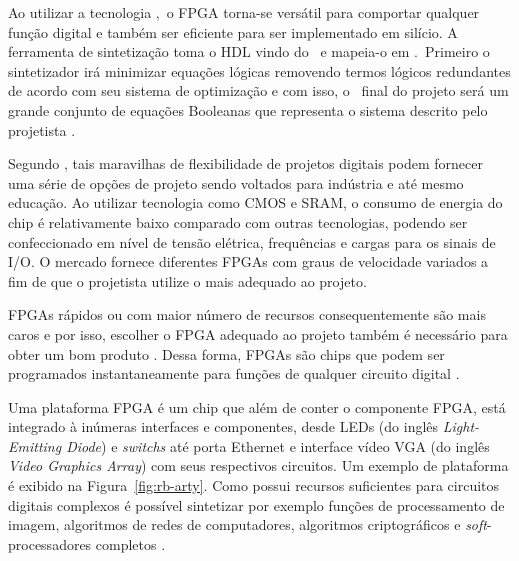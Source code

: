         Ao utilizar a tecnologia \lut,\ o FPGA torna-se versátil para comportar qualquer função digital e também ser eficiente para ser implementado em silício.
        A ferramenta de sintetização toma o HDL vindo do \designer\ e mapeia-o em \hardware.\ 
        Primeiro o sintetizador irá minimizar equações lógicas removendo termos lógicos redundantes de acordo com seu sistema de optimização e com isso, o \design\ final do projeto será um grande conjunto de equações Booleanas que representa o sistema descrito pelo projetista \citep{coffman1999real}.
       
        
        Segundo \citet{tocci2003sistemas}, tais maravilhas de flexibilidade de projetos digitais podem fornecer uma série de opções de projeto sendo voltados para indústria e até mesmo educação.
        Ao utilizar tecnologia como CMOS e SRAM, o consumo de energia do chip é relativamente baixo comparado com outras tecnologias, podendo ser confeccionado em nível de tensão elétrica, frequências e cargas para os sinais de I/O.
        O mercado fornece diferentes FPGAs com graus de velocidade variados a fim de que o projetista utilize o mais adequado ao projeto.
        
        FPGAs rápidos ou com maior número de recursos consequentemente são mais caros e por isso, escolher o FPGA adequado ao projeto também é necessário para obter um bom produto \cite{coffman1999real}.
        Dessa forma, FPGAs são chips que podem ser programados instantaneamente para funções de qualquer circuito digital \citep{Choi2016}.
        
        
        
        
        Uma plataforma FPGA é um chip que além de conter o componente FPGA, está integrado à inúmeras interfaces e componentes, desde LEDs (do inglês \textit{Light-Emitting Diode}) e \textit{switchs} até porta Ethernet e interface vídeo VGA (do inglês \textit{Video Graphics Array}) com seus respectivos circuitos.
        Um exemplo de plataforma é exibido na Figura~\ref{fig:rb-arty}.
        Como possui recursos suficientes para circuitos digitais complexos é possível sintetizar por exemplo funções de processamento de imagem, algoritmos de redes de computadores, algoritmos criptográficos e \textit{soft}-processadores completos \citep{Plessl2003}.
        
